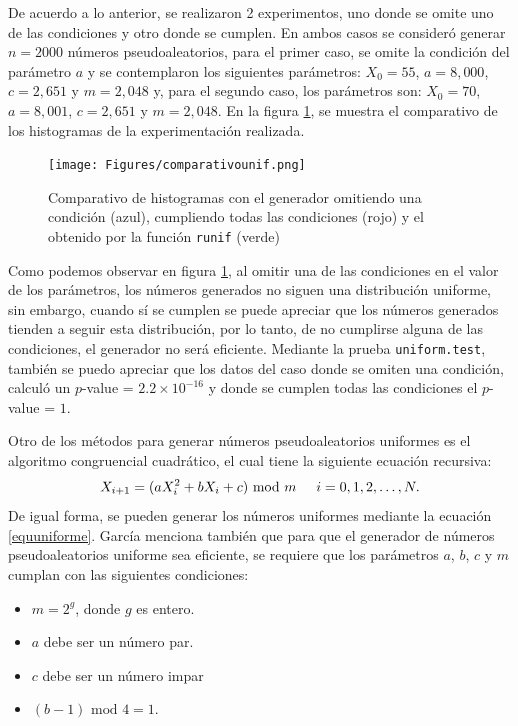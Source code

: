 \documentclass{article}
\begin{document}
De acuerdo a lo anterior, se realizaron 2 experimentos, uno donde se omite uno de las condiciones y otro donde se cumplen. En ambos casos se consideró generar $n=2000$ números pseudoaleatorios, para el primer caso, se omite la condición del parámetro $a$ y se contemplaron los siguientes parámetros: $X_{0}=55$, $a = 8,000$, $c = 2,651$ y $m = 2,048$ y, para el segundo caso, los parámetros son: $X_{0}=70$, $a = 8,001$, $c = 2,651$ y $m = 2,048$. En la figura \ref{pseudouniforme}, se muestra el comparativo de los histogramas de la experimentación realizada.
\begin{figure}
\centering
\texttt{[image: Figures/comparativounif.png]}
\caption{Comparativo de histogramas con el generador omitiendo una condición (azul), cumpliendo todas las condiciones (rojo) y el obtenido por la función \texttt{runif} (verde)}
\label{pseudouniforme}
\end{figure}
Como podemos observar en figura \ref{pseudouniforme}, al omitir una de las condiciones en el valor de los parámetros, los números generados no siguen una distribución uniforme, sin embargo, cuando sí se cumplen se puede apreciar que los números generados tienden a seguir esta distribución, por lo tanto, de no cumplirse alguna de las condiciones, el generador no será eficiente. Mediante la prueba \texttt{uniform.test}, también se puedo apreciar que los datos del caso donde se omiten una condición, calculó un $p$-value = $2.2 \times 10^{-16}$ y donde se cumplen todas las condiciones el $p$-value = $1$.

Otro de los métodos para generar números pseudoaleatorios uniformes es el algoritmo congruencial cuadrático, el cual tiene la siguiente ecuación recursiva:
\begin{equation}
X_ {i+1}= (aX_{i}^{2} + bX_{i} + c) \text{ mod } m \hspace{0,5cm}i=0, 1, 2, \dots, N.
\end{equation}
De igual forma, se pueden generar los números uniformes mediante la ecuación \ref{equuniforme}. García \cite{promodel} menciona también que para que el generador de números pseudoaleatorios uniforme sea eficiente, se requiere que los parámetros $a$, $b$, $c$ y $m$ cumplan con las siguientes condiciones:

\begin{itemize}
    \item $m = 2^g$, donde $g$ es entero.
    \item $a$ debe ser un número par.
    \item $c$ debe ser un número impar
    \item $(b-1) \text{ mod } 4 = 1$.
\end{itemize}
\end{document}
